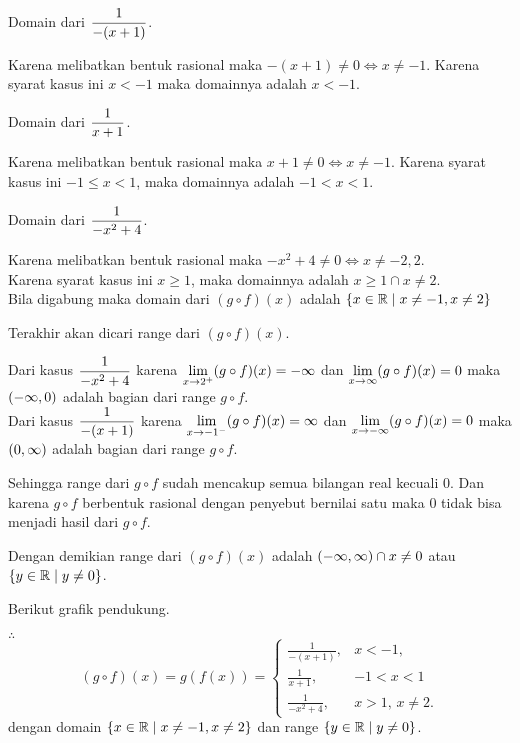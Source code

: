 \begin{enumerate}[leftmargin=*, label={\arabic*}.]
\begin{enumerate}[label={\alph*}.]
    Domain dari $\ds \frac{1}{-(x+1)}$.

    Karena melibatkan bentuk rasional maka $-(x+1) \neq 0 \iff x \neq -1$. Karena 
    syarat kasus ini $x < -1$ maka domainnya adalah $x < -1$.

    Domain dari $\ds \frac{1}{x+1}$.

    Karena melibatkan bentuk rasional maka $x+1 \neq 0 \iff x \neq -1$. Karena 
    syarat kasus ini $-1 \leq x < 1$, maka domainnya adalah $-1 < x < 1$.

    Domain dari $\ds \frac{1}{-x^{2}+4}$.

    Karena melibatkan bentuk rasional maka $-x^{2}+4 \neq 0 \iff x \neq -2,2$.\\
    Karena syarat kasus ini $x \geq 1$, maka domainnya adalah $x \geq 1 \cap x \neq 2$.\\
    Bila digabung maka domain dari $(g \circ f)(x)$ adalah 
    $\set*{x \in \mathbb{R} \mid x \neq -1, x\neq 2}$

    Terakhir akan dicari range dari $(g \circ f)(x)$.

    Dari kasus $\ds \frac{1}{-x^{2}+4}$ 
    karena $\ds \lim_{x\to 2^{+}} (g \circ f)(x) = -\infty$ dan 
    $\ds \lim_{x\to \infty} (g \circ f)(x) = 0$ maka 
    $\oio{-\infty,0}$ adalah bagian dari range $g \circ f$.\\
    Dari kasus $\ds \frac{1}{-(x+1)}$ 
    karena $\ds \lim_{x\to -1^{-}} (g \circ f)(x) = \infty$ dan 
    $\ds \lim_{x\to -\infty} (g \circ f)(x) = 0$ maka 
    $\oio{0,\infty}$ adalah bagian dari range $g \circ f$.

    Sehingga range dari $g \circ f$ sudah mencakup semua bilangan real kecuali $0$.
    Dan karena $g \circ f$ berbentuk rasional dengan penyebut bernilai satu maka $0$ 
    tidak bisa menjadi hasil dari $g \circ f$.

    Dengan demikian range dari $(g \circ f)(x)$ adalah $\oio{-\infty,\infty} \cap x \neq 0$ 
    atau $\set{y \in \mathbb{R} \mid y \neq 0}$.

    Berikut grafik pendukung.

    

    $\therefore$ 
    \[
        (g\circ f)(x) = g(f(x)) = 
        \begin{cases}
            \frac{1}{-(x+1)}, & x < -1,\\
            \frac{1}{x+1}, &-1 < x < 1 \\
            \frac{1}{-x^{2}+4}, &x > 1,\,x \neq 2.
        \end{cases}
    \]
    dengan domain $\set*{x \in \mathbb{R} \mid x \neq -1, x\neq 2}$ dan range
    $\set{y \in \mathbb{R} \mid y \neq 0}$.



\end{enumerate}
\end{enumerate}
